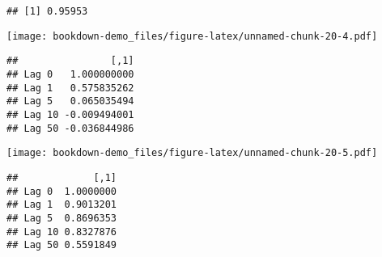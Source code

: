 \documentclass[
]{book}
\newenvironment{Shaded}{\begin{snugshade}}{\end{snugshade}}
\newcommand{\KeywordTok}[1]{\textcolor[rgb]{0.13,0.29,0.53}{\textbf{#1}}}
\newcommand{\NormalTok}[1]{#1}
\newcommand{\OperatorTok}[1]{\textcolor[rgb]{0.81,0.36,0.00}{\textbf{#1}}}
\begin{document}
\begin{verbatim}
## [1] 0.95953
\end{verbatim}

\begin{Shaded}
\end{Shaded}

\texttt{[image: bookdown-demo\_files/figure-latex/unnamed-chunk-20-4.pdf]}

\begin{Shaded}
\end{Shaded}

\begin{verbatim}
##                [,1]
## Lag 0   1.000000000
## Lag 1   0.575835262
## Lag 5   0.065035494
## Lag 10 -0.009494001
## Lag 50 -0.036844986
\end{verbatim}

\begin{Shaded}
\end{Shaded}

\texttt{[image: bookdown-demo\_files/figure-latex/unnamed-chunk-20-5.pdf]}

\begin{Shaded}
\end{Shaded}

\begin{verbatim}
##             [,1]
## Lag 0  1.0000000
## Lag 1  0.9013201
## Lag 5  0.8696353
## Lag 10 0.8327876
## Lag 50 0.5591849
\end{verbatim}
\end{document}
